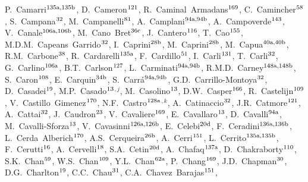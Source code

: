 \begin{flushleft}
P.~Camarri$^\textrm{\scriptsize 135a,135b}$,
D.~Cameron$^\textrm{\scriptsize 121}$,
R.~Caminal~Armadans$^\textrm{\scriptsize 169}$,
C.~Camincher$^\textrm{\scriptsize 58}$,
S.~Campana$^\textrm{\scriptsize 32}$,
M.~Campanelli$^\textrm{\scriptsize 81}$,
A.~Camplani$^\textrm{\scriptsize 94a,94b}$,
A.~Campoverde$^\textrm{\scriptsize 143}$,
V.~Canale$^\textrm{\scriptsize 106a,106b}$,
M.~Cano~Bret$^\textrm{\scriptsize 36c}$,
J.~Cantero$^\textrm{\scriptsize 116}$,
T.~Cao$^\textrm{\scriptsize 155}$,
M.D.M.~Capeans~Garrido$^\textrm{\scriptsize 32}$,
I.~Caprini$^\textrm{\scriptsize 28b}$,
M.~Caprini$^\textrm{\scriptsize 28b}$,
M.~Capua$^\textrm{\scriptsize 40a,40b}$,
R.M.~Carbone$^\textrm{\scriptsize 38}$,
R.~Cardarelli$^\textrm{\scriptsize 135a}$,
F.~Cardillo$^\textrm{\scriptsize 51}$,
I.~Carli$^\textrm{\scriptsize 131}$,
T.~Carli$^\textrm{\scriptsize 32}$,
G.~Carlino$^\textrm{\scriptsize 106a}$,
B.T.~Carlson$^\textrm{\scriptsize 127}$,
L.~Carminati$^\textrm{\scriptsize 94a,94b}$,
R.M.D.~Carney$^\textrm{\scriptsize 148a,148b}$,
S.~Caron$^\textrm{\scriptsize 108}$,
E.~Carquin$^\textrm{\scriptsize 34b}$,
S.~Carr\'a$^\textrm{\scriptsize 94a,94b}$,
G.D.~Carrillo-Montoya$^\textrm{\scriptsize 32}$,
D.~Casadei$^\textrm{\scriptsize 19}$,
M.P.~Casado$^\textrm{\scriptsize 13}$$^{,j}$,
M.~Casolino$^\textrm{\scriptsize 13}$,
D.W.~Casper$^\textrm{\scriptsize 166}$,
R.~Castelijn$^\textrm{\scriptsize 109}$,
V.~Castillo~Gimenez$^\textrm{\scriptsize 170}$,
N.F.~Castro$^\textrm{\scriptsize 128a}$$^{,k}$,
A.~Catinaccio$^\textrm{\scriptsize 32}$,
J.R.~Catmore$^\textrm{\scriptsize 121}$,
A.~Cattai$^\textrm{\scriptsize 32}$,
J.~Caudron$^\textrm{\scriptsize 23}$,
V.~Cavaliere$^\textrm{\scriptsize 169}$,
E.~Cavallaro$^\textrm{\scriptsize 13}$,
D.~Cavalli$^\textrm{\scriptsize 94a}$,
M.~Cavalli-Sforza$^\textrm{\scriptsize 13}$,
V.~Cavasinni$^\textrm{\scriptsize 126a,126b}$,
E.~Celebi$^\textrm{\scriptsize 20d}$,
F.~Ceradini$^\textrm{\scriptsize 136a,136b}$,
L.~Cerda~Alberich$^\textrm{\scriptsize 170}$,
A.S.~Cerqueira$^\textrm{\scriptsize 26b}$,
A.~Cerri$^\textrm{\scriptsize 151}$,
L.~Cerrito$^\textrm{\scriptsize 135a,135b}$,
F.~Cerutti$^\textrm{\scriptsize 16}$,
A.~Cervelli$^\textrm{\scriptsize 18}$,
S.A.~Cetin$^\textrm{\scriptsize 20d}$,
A.~Chafaq$^\textrm{\scriptsize 137a}$,
D.~Chakraborty$^\textrm{\scriptsize 110}$,
S.K.~Chan$^\textrm{\scriptsize 59}$,
W.S.~Chan$^\textrm{\scriptsize 109}$,
Y.L.~Chan$^\textrm{\scriptsize 62a}$,
P.~Chang$^\textrm{\scriptsize 169}$,
J.D.~Chapman$^\textrm{\scriptsize 30}$,
D.G.~Charlton$^\textrm{\scriptsize 19}$,
C.C.~Chau$^\textrm{\scriptsize 31}$,
C.A.~Chavez~Barajas$^\textrm{\scriptsize 151}$,

\end{flushleft}
